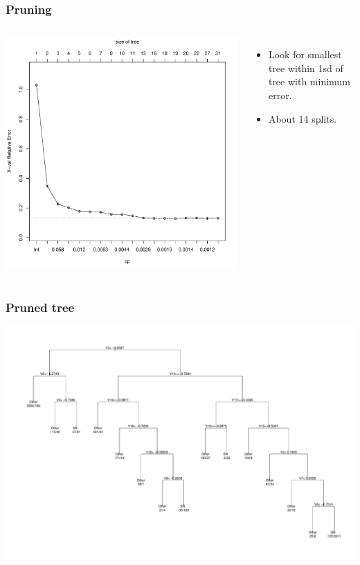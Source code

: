 \documentclass{beamer}
\begin{document}
\begin{frame}
\frametitle{Pruning}
\begin{columns}[c] %
\includegraphics{cp.pdf}
	\begin{itemize}
		\item Look for smallest tree within 1sd of tree with minimum  error. 
		\item About 14 splits.
	\end{itemize}
	\end{columns}
\end{frame}

\begin{frame}
\frametitle{Pruned tree}
\includegraphics{tree.pdf}
\end{frame}
\end{document}

